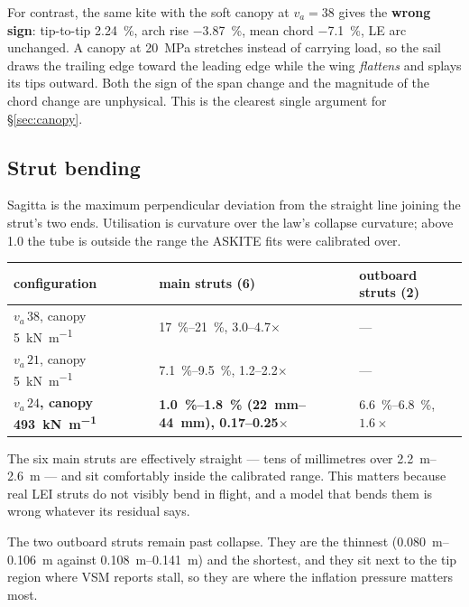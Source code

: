 \documentclass[11pt,a4paper]{article}
\begin{document}
For contrast, the same kite with the soft canopy at $v_a = 38$ gives the
\textbf{wrong sign}: tip-to-tip \SI{+2.24}{\percent}, arch rise
\SI{-3.87}{\percent}, mean chord \SI{-7.1}{\percent}, LE arc unchanged. A canopy
at \SI{20}{\mega\pascal} stretches instead of carrying load, so the sail draws
the trailing edge toward the leading edge while the wing \emph{flattens} and
splays its tips outward. Both the sign of the span change and the magnitude of
the chord change are unphysical. This is the clearest single argument for
\S\ref{sec:canopy}.

\subsection{Strut bending}

Sagitta is the maximum perpendicular deviation from the straight line joining
the strut's two ends. Utilisation is curvature over the law's collapse
curvature; above 1.0 the tube is outside the range the ASKITE fits were
calibrated over.

\begin{center}\small
\begin{tabular}{@{}lll@{}}
\toprule
\textbf{configuration} & \textbf{main struts (6)} & \textbf{outboard struts (2)} \\
\midrule
$v_a\,38$, canopy \SI{5}{\kilo\newton\per\metre} & \SIrange{17}{21}{\percent}, \numrange{3.0}{4.7}$\times$ & --- \\
$v_a\,21$, canopy \SI{5}{\kilo\newton\per\metre} & \SIrange{7.1}{9.5}{\percent}, \numrange{1.2}{2.2}$\times$ & --- \\
\textbf{$v_a\,24$, canopy \SI{493}{\kilo\newton\per\metre}} & \textbf{\SIrange{1.0}{1.8}{\percent} (\SIrange{22}{44}{\milli\metre}), \numrange{0.17}{0.25}$\times$} & \SIrange{6.6}{6.8}{\percent}, $1.6\times$ \\
\bottomrule
\end{tabular}
\end{center}

The six main struts are effectively straight --- tens of millimetres over
\SIrange{2.2}{2.6}{\metre} --- and sit comfortably inside the calibrated range.
This matters because real LEI struts do not visibly bend in flight, and a model
that bends them is wrong whatever its residual says.

The two outboard struts remain past collapse. They are the thinnest
(\SIrange{0.080}{0.106}{\metre} against \SIrange{0.108}{0.141}{\metre}) and the
shortest, and they sit next to the tip region where VSM reports stall, so they
are where the inflation pressure matters most.
\end{document}

